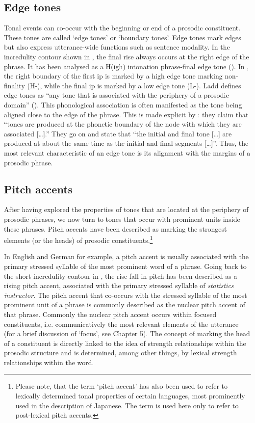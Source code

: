 \subsection{Edge tones}
Tonal events can co-occur with the beginning or end of a prosodic constituent. These tones are called ‘edge tones’ or ‘boundary tones’. Edge tones mark edges but also express utterance-wide functions such as sentence modality. In the incredulity contour shown in , the final rise always occurs at the right edge of the phrase. It has been analysed as a H(igh) intonation phrase-final edge tone (\citealt{HirschbergWard1992}). In , the right boundary of the first ip is marked by a high edge tone marking non-finality (H-), while the final ip is marked by a low edge tone (L-). Ladd defines edge tones as “any tone that is associated with the periphery of a prosodic domain” (\citealt[47]{Ladd2008}). This phonological association is often manifested as the tone being aligned close to the edge of the phrase. This is made explicit by \citet[127]{PierrBeck1988}: they claim that “tones are produced at the phonetic boundary of the node with which they are associated […].” They go on and state that “the initial and final tone […] are produced at about the same time as the initial and final segments […]”. Thus, the most relevant characteristic of an edge tone is its alignment with the margins of a prosodic phrase.

\subsection{Pitch accents}
After having explored the properties of tones that are located at the periphery of prosodic phrases, we now turn to tones that occur with prominent units inside these phrases. Pitch accents have been described as marking the strongest elements (or the heads) of prosodic constituents.\footnote{Please note, that the term ‘pitch accent’ has also been used to refer to lexically determined tonal properties of certain languages, most prominently used in the description of Japanese. The term is used here only to refer to post-lexical pitch accents.}

In English and German for example, a pitch accent is usually associated with the primary stressed syllable of the most prominent word of a phrase. Going back to the short incredulity contour in , the rise-fall in pitch has been described as a rising pitch accent, associated with the primary stressed syllable of \textit{statistics instructor}. The pitch accent that co-occurs with the stressed syllable of the most prominent unit of a phrase is commonly described as the nuclear pitch accent of that phrase. Commonly the nuclear pitch accent occurs within focused constituents, i.e. communicatively the most relevant elements of the utterance (for a brief discussion of ‘focus’, see Chapter 5). The concept of marking the head of a constituent is directly linked to the idea of strength relationships within the prosodic structure and is determined, among other things, by lexical strength relationships within the word. 


